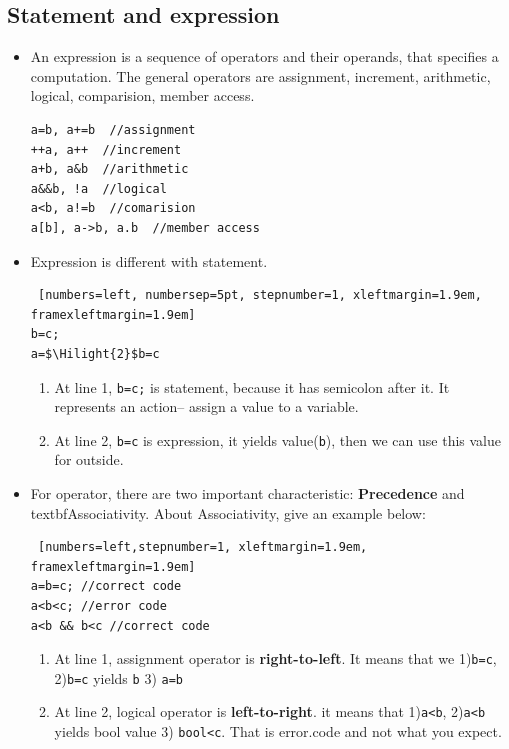 \documentclass[a4paper,11pt,twoside]{book}
\newcommand{\Hilight}[1]{\makebox[0pt][l]{\color{yellow}\rule[-3pt]{#1em}{11pt}}}
\newcommand{\Hilight}[1]{}
\begin{document}
\subsection{Statement and expression}
\begin{itemize}
	\item An expression is a sequence of operators and their operands, that specifies a computation. The general operators are assignment, increment, arithmetic, logical, comparision, member access.
\begin{lstlisting}
a=b, a+=b  //assignment
++a, a++  //increment
a+b, a&b  //arithmetic
a&&b, !a  //logical
a<b, a!=b  //comarision
a[b], a->b, a.b  //member access
\end{lstlisting}
	
	\item Expression is different with statement. 
\begin{lstlisting} [numbers=left, numbersep=5pt, stepnumber=1, xleftmargin=1.9em, framexleftmargin=1.9em]
b=c;
a=$\Hilight{2}$b=c
\end{lstlisting}

\begin{enumerate}
\item At line 1, \texttt{b=c;} is statement, because it has semicolon after it. It represents an action-- assign a value to a variable.
\item At line 2, \texttt{b=c} is expression, it yields value(\texttt{b}), then we can use this value for outside.
\end{enumerate}
	
	\item For operator, there are two important characteristic: \textbf{Precedence} and textbf{Associativity}. About Associativity, give an example below:
\begin{lstlisting} [numbers=left,stepnumber=1, xleftmargin=1.9em, framexleftmargin=1.9em]
a=b=c; //correct code
a<b<c; //error code
a<b && b<c //correct code
\end{lstlisting}

\begin{enumerate}
	\item At line 1, assignment operator is \textbf{right-to-left}. It means that we 1)\texttt{b=c}, 2)\texttt{b=c} yields \texttt{b} 3) \texttt{a=b} 
	
	\item At line 2, logical operator is \textbf{left-to-right}. it means that 1)\texttt{a<b}, 2)\texttt{a<b} yields bool value 3) \texttt{bool<c}. That is error.code and not what you expect. 
	

\end{enumerate}
\end{itemize}
\end{document}
